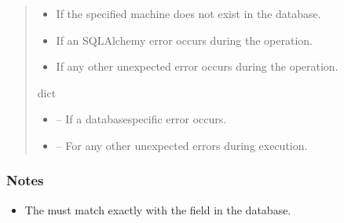 \documentclass[letterpaper,10pt,english]{sphinxmanual}
\begin{document}
\begin{fulllineitems}
\begin{fulllineitems}
\begin{quote}
\begin{description}
\begin{description}
\begin{itemize}
\begin{description}
\end{description}

\item {} \begin{description}
\sphinxAtStartPar
If the specified machine does not exist in the database.

\end{description}

\item {} \begin{description}
\sphinxAtStartPar
If an SQLAlchemy error occurs during the operation.

\end{description}

\item {} \begin{description}
\sphinxAtStartPar
If any other unexpected error occurs during the operation.

\end{description}

\end{itemize}

\end{description}


\sphinxAtStartPar
dict

\begin{itemize}
\item {} 
\sphinxAtStartPar
{} – If a database\sphinxhyphen{}specific error occurs.

\item {} 
\sphinxAtStartPar
{} – For any other unexpected errors during execution.

\end{itemize}

\end{description}\end{quote}
\subsubsection*{Notes}
\begin{itemize}
\item {} 
\sphinxAtStartPar
The  must match exactly with the  field in the database.


\end{itemize}
\end{fulllineitems}
\end{fulllineitems}
\end{document}
